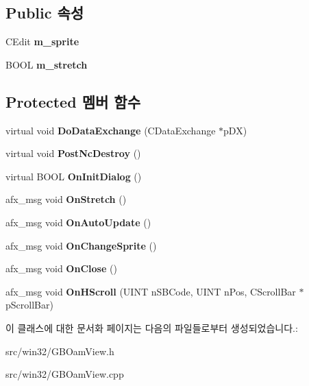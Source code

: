 \subsection*{Public 속성}
\begin{DoxyCompactItemize}
\item 
\mbox{\label{class_g_b_oam_view_a696d053b141cce3bf87fc4b85732159b}} 
C\+Edit {\bfseries m\+\_\+sprite}
\item 
\mbox{\label{class_g_b_oam_view_a3148ea0439a7fc0679298adbdb5d2a3e}} 
B\+O\+OL {\bfseries m\+\_\+stretch}
\end{DoxyCompactItemize}
\subsection*{Protected 멤버 함수}
\begin{DoxyCompactItemize}
\item 
\mbox{\label{class_g_b_oam_view_ab5683ad7b53ee6ac8208155503164506}} 
virtual void {\bfseries Do\+Data\+Exchange} (C\+Data\+Exchange $\ast$p\+DX)
\item 
\mbox{\label{class_g_b_oam_view_ac9b79cd9099423b88668870db35a739a}} 
virtual void {\bfseries Post\+Nc\+Destroy} ()
\item 
\mbox{\label{class_g_b_oam_view_a633fdb700275a8a8ce96978472c643b5}} 
virtual B\+O\+OL {\bfseries On\+Init\+Dialog} ()
\item 
\mbox{\label{class_g_b_oam_view_a580f292889a2fd21ab0bbf217d6abaa3}} 
afx\+\_\+msg void {\bfseries On\+Stretch} ()
\item 
\mbox{\label{class_g_b_oam_view_a2c508aeb9089bfb1a21f88bd92c6753d}} 
afx\+\_\+msg void {\bfseries On\+Auto\+Update} ()
\item 
\mbox{\label{class_g_b_oam_view_aabd5dcff93f2d91fbc979853123cd30f}} 
afx\+\_\+msg void {\bfseries On\+Change\+Sprite} ()
\item 
\mbox{\label{class_g_b_oam_view_a09793b8c72f602f1e30b802552c13ee3}} 
afx\+\_\+msg void {\bfseries On\+Close} ()
\item 
\mbox{\label{class_g_b_oam_view_a06667c6c7951c82b8a222b6663d2e999}} 
afx\+\_\+msg void {\bfseries On\+H\+Scroll} (U\+I\+NT n\+S\+B\+Code, U\+I\+NT n\+Pos, C\+Scroll\+Bar $\ast$p\+Scroll\+Bar)
\end{DoxyCompactItemize}


이 클래스에 대한 문서화 페이지는 다음의 파일들로부터 생성되었습니다.\+:\begin{DoxyCompactItemize}
\item 
src/win32/G\+B\+Oam\+View.\+h\item 
src/win32/G\+B\+Oam\+View.\+cpp\end{DoxyCompactItemize}
